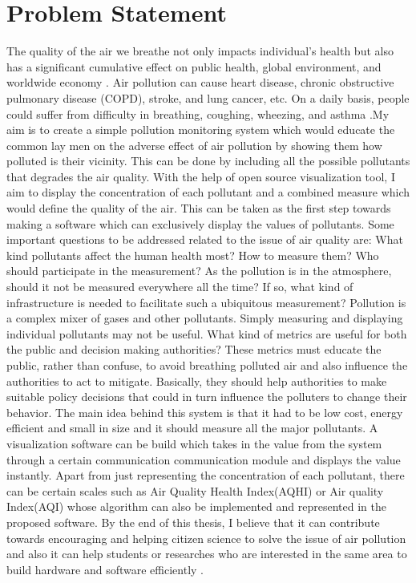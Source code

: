 \documentclass[10pt,a4paper]{report}
\begin{document}
\chapter{Problem Statement}

The quality of the air we breathe not only impacts individual's health but also has a significant cumulative effect on public health, global environment, and worldwide economy \cite{AQI14}. Air pollution can cause heart disease, chronic obstructive pulmonary disease (COPD), stroke, and lung cancer, etc. On a daily basis, people could suffer from difficulty in breathing, coughing, wheezing, and asthma \cite{AQI14}.My aim is to create a simple pollution monitoring system which would educate the common lay men on the adverse effect of air pollution by showing them how polluted is their vicinity.  This can be done by including all the possible pollutants that degrades the air quality. With the help of open source visualization tool, I aim to display the concentration of each pollutant and a combined measure which would define the quality of the air. This can be taken as the first step towards making a software which can exclusively display the values of pollutants. 
Some important questions to be addressed related to the issue of air quality are: What kind pollutants affect the human health most? How to measure them? Who should participate in the measurement? As the pollution is in the atmosphere, should it not be measured everywhere all the time? If so, what kind of infrastructure is needed to facilitate such a ubiquitous measurement? Pollution is a complex mixer of gases and other pollutants. Simply measuring and displaying individual pollutants may not be useful. What kind of metrics are useful for both the public and decision making authorities? These metrics must educate the public, rather than confuse, to avoid breathing polluted air and also influence the authorities to act to mitigate. Basically, they should help authorities to make suitable policy decisions that could in turn influence the polluters to change their behavior.
The main idea behind this system is that it had to be low cost, energy efficient and small in size and it should measure all the major pollutants. A visualization software can be build which takes in the value from the system through a certain communication communication module and displays the value instantly. Apart from just representing the concentration of each pollutant, there can be certain scales such as Air Quality Health Index(AQHI) or Air quality Index(AQI) whose algorithm can also be implemented and represented in the proposed software. 
By the end of this thesis, I believe that it can contribute towards encouraging and helping citizen science to solve the issue of air pollution and also it can help students or researches who are interested in the same area to build hardware and software efficiently .
\end{document}
